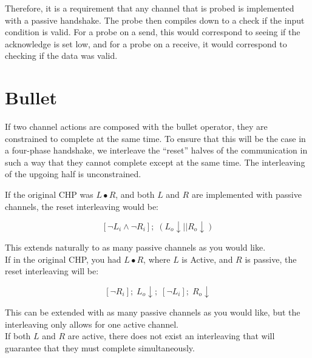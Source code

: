 \documentclass[times, 10pt]{article}
\begin{document}
Therefore, it is a requirement that any channel that is probed is implemented with a passive handshake. The probe then compiles down to a check if the input condition is valid.  For a probe on a send, this would correspond to seeing if the acknowledge is set low, and for a probe on a receive, it would correspond to checking if the data was valid.

\section{Bullet}

If two channel actions are composed with the bullet operator, they are constrained to complete at the same time.  To ensure that this will be the case in a four-phase handshake, we interleave the ``reset'' halves of the communication in such a way that they cannot complete except at the same time.  The interleaving of the upgoing half is unconstrained.

If the original CHP was $L\bullet R$, and both $L$ and $R$ are implemented with passive channels, the reset interleaving would be:

\[
[\lnot L_i \wedge \lnot R_i]; \;(L_o\!\downarrow || R_o \! \downarrow)
\]

This extends naturally to as many passive channels as you would like.
\\


If in the original CHP, you had $L \bullet R$, where $L$ is Active, and $R$ is passive, the reset interleaving will be:

\[
[\lnot R_i]; \; L_o\! \downarrow; \; [\lnot L_i]; \; R_o\! \downarrow
\]

This can be extended with as many passive channels as you would like, but the interleaving only allows for one active channel.
\\

If both $L$ and $R$ are active, there does not exist an interleaving that will guarantee that they must complete simultaneously. 
\end{document}
